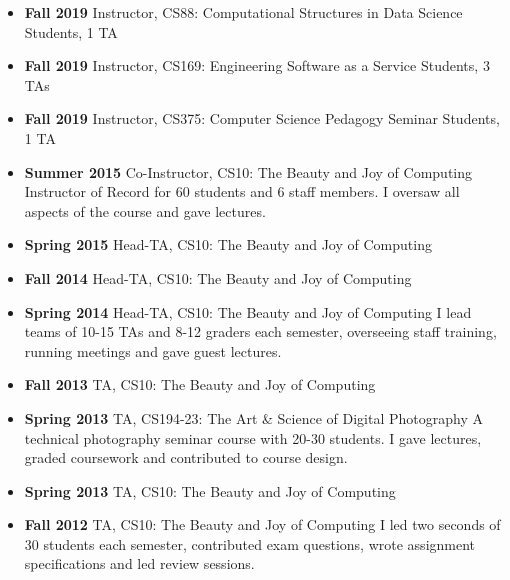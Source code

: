 \begin{itemize}
    \item \textbf{Fall 2019} Instructor, CS88: Computational Structures in Data Science
     Students, 1 TA
    
    \item \textbf{Fall 2019} Instructor, CS169: Engineering Software as a Service
     Students, 3 TAs
    
    \item \textbf{Fall 2019} Instructor, CS375: Computer Science Pedagogy Seminar
     Students, 1 TA
    
    \item \textbf{Summer 2015} Co-Instructor, CS10: The Beauty and Joy of Computing
    \newline
    \small Instructor of Record for 60 students and 6 staff members. I oversaw all aspects of the course and gave lectures.

    \item \textbf{Spring 2015} Head-TA, CS10: The Beauty and Joy of Computing
    
    \item \textbf{Fall 2014} Head-TA, CS10: The Beauty and Joy of Computing
    
    \item \textbf{Spring 2014} Head-TA, CS10: The Beauty and Joy of Computing
    \newline
    \small I lead teams of 10-15 TAs and 8-12 graders each semester, overseeing staff training, running meetings and gave guest lectures.
    
    \item \textbf{Fall 2013} TA, CS10: The Beauty and Joy of Computing
    
    \item \textbf{Spring 2013} TA, CS194-23: The Art \& Science of Digital Photography
    \newline
    \small A technical photography seminar course with 20-30 students. I gave lectures, graded coursework and contributed to course design.
    
    \item \textbf{Spring 2013} TA, CS10: The Beauty and Joy of Computing
    \item \textbf{Fall 2012} TA, CS10: The Beauty and Joy of Computing
    \newline
    \small I led two seconds of 30 students each semester, contributed exam questions, wrote assignment specifications and led review sessions.
    
\end{itemize}
